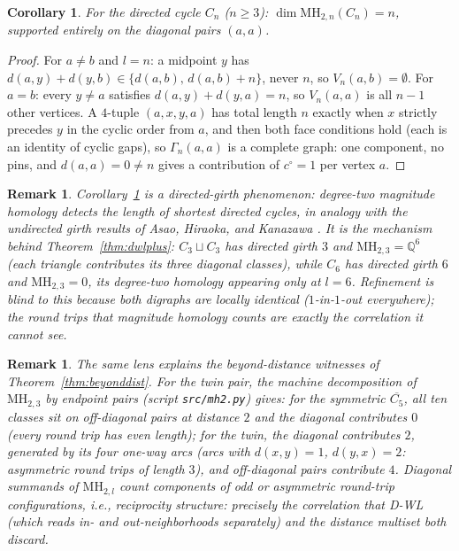 \documentclass[pdflatex,sn-mathphys,Numbered]{sn-jnl}
\theoremstyle{thmstyleone}
\newtheorem{corollary}[theorem]{Corollary}
\theoremstyle{thmstyletwo}
\newtheorem{remark}[theorem]{Remark}
\newcommand{\MH}{\mathrm{MH}}
\newcommand{\QQ}{\mathbb{Q}}
\begin{document}
\begin{corollary}\label{cor:cycles}
For the directed cycle $C_n$ ($n \ge 3$):
$\dim \MH_{2,n}(C_n) = n$, supported entirely on the diagonal pairs
$(a,a)$.
\end{corollary}

\begin{proof}
For $a \ne b$ and $l = n$: a midpoint $y$ has
$d(a,y) + d(y,b) \in \{d(a,b),\, d(a,b) + n\}$, never $n$, so
$V_n(a,b) = \emptyset$. For $a = b$: every $y \ne a$ satisfies
$d(a,y) + d(y,a) = n$, so $V_n(a,a)$ is all $n{-}1$ other vertices. A
$4$-tuple $(a,x,y,a)$ has total length $n$ exactly when $x$ strictly
precedes $y$ in the cyclic order from $a$, and then both face
conditions hold (each is an identity of cyclic gaps), so
$\Gamma_n(a,a)$ is a complete graph: one component, no pins, and
$d(a,a) = 0 \ne n$ gives a contribution of $c^{\circ} = 1$ per vertex
$a$.
\end{proof}

\begin{remark}\label{rem:girth}
Corollary~\ref{cor:cycles} is a directed-girth phenomenon: degree-two
magnitude homology detects the length of shortest directed cycles, in
analogy with the undirected girth results of Asao, Hiraoka, and
Kanazawa \cite{AHK24}. It is the mechanism behind
Theorem~\ref{thm:dwlplus}: $C_3 \sqcup C_3$ has directed girth $3$ and
$\MH_{2,3} = \QQ^6$ (each triangle contributes its three diagonal
classes), while $C_6$ has directed girth $6$ and $\MH_{2,3} = 0$, its
degree-two homology appearing only at $l = 6$. Refinement is blind to
this because both digraphs are locally identical ($1$-in-$1$-out
everywhere); the round trips that magnitude homology counts are exactly
the correlation it cannot see.
\end{remark}

\begin{remark}\label{rem:twinsmech}
The same lens explains the beyond-distance witnesses of
Theorem~\ref{thm:beyonddist}. For the twin pair, the machine
decomposition of $\MH_{2,3}$ by endpoint pairs (script
\texttt{src/mh2.py}) gives: for the symmetric $\overline{C_5}$, all
ten classes sit on off-diagonal pairs at distance $2$ and the diagonal
contributes $0$ (every round trip has even length); for the twin,
the diagonal contributes $2$, generated by its four one-way arcs
(arcs with $d(x,y) = 1$, $d(y,x) = 2$: asymmetric round trips of
length $3$), and off-diagonal pairs contribute $4$. Diagonal summands
of $\MH_{2,l}$ count components of odd or asymmetric round-trip
configurations, i.e., reciprocity structure: precisely the correlation
that D-WL (which reads in- and out-neighborhoods separately) and the
distance multiset both discard.
\end{remark}
\end{document}
